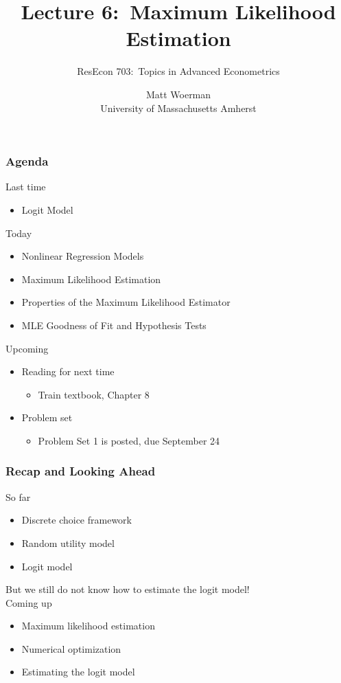 \documentclass{beamer}
\title[Lecture 6:\ Maximum Likelihood Estimation]{Lecture 6:\ Maximum Likelihood Estimation}
\author[ResEcon 703:\ Advanced Econometrics]{ResEcon 703:\ Topics in Advanced Econometrics}
\date{Matt Woerman\\University of Massachusetts Amherst}
\begin{document}
{ 
\begin{frame}[noframenumbering]
    \titlepage
\end{frame}
}

\begin{frame}\frametitle{Agenda}
    Last time
    \begin{itemize}
        \item Logit Model
    \end{itemize}
    \vspace{2ex}
    Today
    \begin{itemize}
    	\item Nonlinear Regression Models
        \item Maximum Likelihood Estimation
        \item Properties of the Maximum Likelihood Estimator
        \item MLE Goodness of Fit and Hypothesis Tests
    \end{itemize}
    \vspace{2ex}
    Upcoming
    \begin{itemize}
        \item Reading for next time
        \begin{itemize}
            \item Train textbook, Chapter 8
        \end{itemize}
        \item Problem set
        \begin{itemize}
            \item Problem Set 1 is posted, due September 24
        \end{itemize}
    \end{itemize}
\end{frame}

\begin{frame}\frametitle{Recap and Looking Ahead}
    So far
    \begin{itemize}
        \item Discrete choice framework
        \item Random utility model
        \item Logit model
    \end{itemize}
    \vspace{3ex}
    But we still do not know how to estimate the logit model! \\
    \vspace{3ex}
    Coming up
    \begin{itemize}
        \item Maximum likelihood estimation
        \item Numerical optimization
        \item Estimating the logit model
    \end{itemize}
\end{frame}
\end{document}
